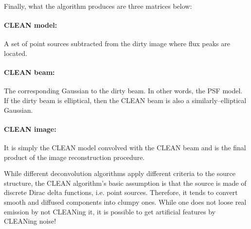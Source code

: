 \documentclass[a4wide,12pt]{book}
\begin{document}
Finally, what the algorithm produces are three matrices below:
\paragraph*{CLEAN model:} A set of point sources subtracted from the dirty image where flux peaks are located.
\paragraph*{CLEAN beam:} The corresponding Gaussian to the dirty beam. In other words, the PSF model. If the dirty beam is elliptical, then the CLEAN beam is also a similarly--elliptical Gaussian.
\paragraph*{CLEAN image:} It is simply the CLEAN model convolved with the CLEAN beam and is the final product of the image reconstruction procedure. 


While different deconvolution algorithms apply different criteria to the source structure, the CLEAN algorithm's basic assumption is that the source is made of discrete Dirac delta functions, i.e. point sources. Therefore, it tends to convert smooth and diffused components into clumpy ones. While one does not loose real emission by not CLEANing it, it is possible to get artificial features by CLEANing noise!
\end{document}
